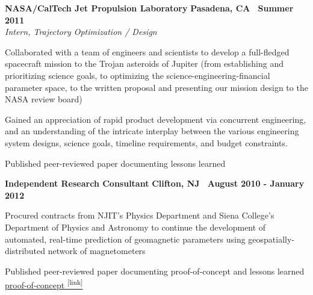 \documentclass[10pt]{article}
\newcommand{\leftandright}[2]{\noindent\textbf{#1}\hfill
\textbf{#2}}
\begin{document}
\leftandright{NASA/CalTech Jet Propulsion Laboratory}{Pasadena, CA \textbullet\, Summer 2011}\\  
\vspace{-0.8em}
\textit{Intern, Trajectory Optimization / Design} 
\begin{itemize*}
  \item

    Collaborated with a team of engineers and scientists to develop a full-fledged spacecraft mission to
    the Trojan asteroids of Jupiter
    (from %
    establishing and prioritizing science goals, to optimizing the science-engineering-financial
    parameter space, to the written proposal and presenting our mission design to the NASA review
    board)
  \item 
    Gained an appreciation of rapid product development via concurrent
    engineering, and an understanding of the intricate interplay between the
    various engineering system designs, science goals, timeline
    requirements, and budget constraints.
  \item Published peer-reviewed paper documenting lessons learned
\end{itemize*}


\leftandright{Independent Research Consultant}{Clifton, NJ \textbullet\, 
August 2010 - January 2012} \par
\vspace{-0.8em}
\begin{itemize*}
  \item Procured contracts from NJIT's Physics Department and Siena
    College's Department of Physics and Astronomy to 
    continue the development of automated, real-time prediction of geomagnetic parameters
    using geospatially-distributed network of magnetometers
  \item Published peer-reviewed paper documenting proof-of-concept and 
    lessons learned
    \href{http://onlinelibrary.wiley.com/doi/10.1029/2011SW000688/full}
    {proof-of-concept \textsuperscript{\tiny{[link]}}}
\end{itemize*}   
\end{document}
